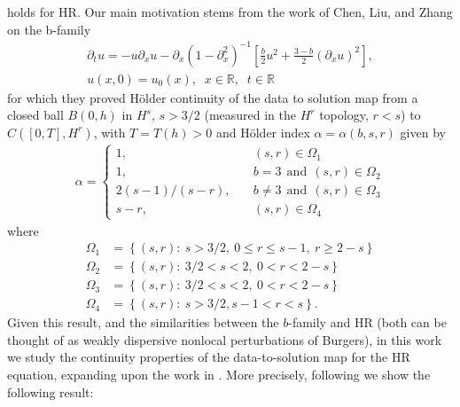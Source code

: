 \documentclass[12pt,reqno]{amsart}
\numberwithin{equation}{section}  %
\numberwithin{figure}{section}
\newcommand{\rr}{\mathbb{R}}
\newcommand{\p}{\partial}
\begin{document}
holds for HR\@. Our main motivation stems from the work of Chen, Liu, and Zhang
\cite{Chen:2011fk} on the
b-family
%
%
\begin{gather}
 \p_t u =  -u \p_x u -
 \p_{x} (1 - \p_{x}^{2})^{-1} \left[ \frac{b}{2}u^2 +
\frac{3-b}{2} \left( \p_x u \right)^2
\right],
\label{b-family}
\\
 u(x,0) = u_0(x), \; \; x \in \rr, \; \; t \in \rr
\label{init-cond-b-fam}
\end{gather}
%
%
for which they proved H\"older continuity of the data to solution map from a closed ball $B(0, h)$ in $H^{s}$, $s >
3/2$ (measured in the $H^{r}$ topology, $r <s$) to $C([0, T], H^{r})$, with $T
= T(h)> 0$ and H\"older index $\alpha = \alpha(b, s, r)$ given by 
%
%
\begin{equation*}
\begin{split}
\alpha = 
\begin{cases}
    1, \quad & (s, r) \in \Omega_{1}
    \\
    1, \quad & b=3 \ \ \text{and} \ \ (s, r) \in \Omega_{2}
    \\
    2(s-1)/(s-r), \quad  & b\neq 3 \ \ \text{and} \ \ (s, r) \in \Omega_{3}
    \\
    s-r, \quad & (s, r) \in \Omega_{4}
\end{cases}
\end{split}
\end{equation*}
%
%
where
\begin{equation*}
\begin{split}
    \Omega_{1} & = \left\{ (s, r): \   s > 3/2, \ 0 \le r \le s-1, \  r \ge 2-s \right\}
    \\
    \Omega_{2} & = \left\{(s, r): \  3/2 < s < 2, \ 0 < r < 2-s   \right\}
    \\
    \Omega_{3} & =  \left\{ (s, r): \  3/2 < s < 2, \ 0 < r < 2-s   \right\}
    \\
    \Omega_{4} & = \left\{ (s,r): \  s > 3/2, s-1 < r < s  \right\}.
\end{split}
\end{equation*}
Given this result, and the similarities between the $b$-family and HR (both can
be thought of as weakly dispersive nonlocal perturbations of Burgers), in this
work we study the continuity properties of the
data-to-solution map for the HR equation, expanding upon the work in
\cite{Karapetyan:2010fk}. More precisely, following \cite{Chen:2011fk} we show
the following result:
%
%
\end{document}
